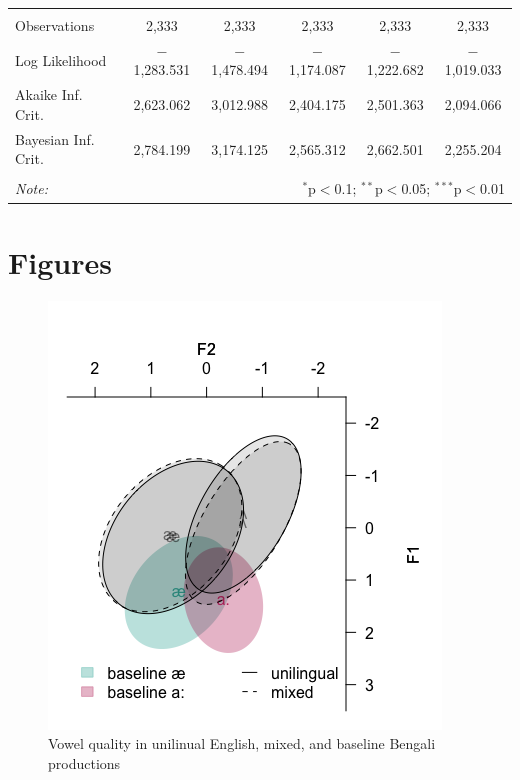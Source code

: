\documentclass[12 pt]{article}
\begin{document}
\begin{table}[htbp]
\begin{tabular}{@{\extracolsep{5pt}}lccccc}
		\hline \\[-1.8ex] 
		Observations & 2,333 & 2,333 & 2,333 & 2,333 & 2,333 \\ 
		Log Likelihood & $-$1,283.531 & $-$1,478.494 & $-$1,174.087 & $-$1,222.682 & $-$1,019.033 \\ 
		Akaike Inf. Crit. & 2,623.062 & 3,012.988 & 2,404.175 & 2,501.363 & 2,094.066 \\ 
		Bayesian Inf. Crit. & 2,784.199 & 3,174.125 & 2,565.312 & 2,662.501 & 2,255.204 \\ 
		\hline 
		\hline \\[-1.8ex] 
		\textit{Note:}  & \multicolumn{5}{r}{$^{*}$p$<$0.1; $^{**}$p$<$0.05; $^{***}$p$<$0.01} \\ 
	\end{tabular} 
\end{table} 

\newpage

\section*{Figures}

\begin{figure}[h] %
	\includegraphics[scale=1]{vowels_e_b_final}
	\caption{Vowel quality in unilinual English, mixed, and baseline Bengali productions}
	\label{vowels_e_b}
\end{figure}

\newpage
\end{document}
